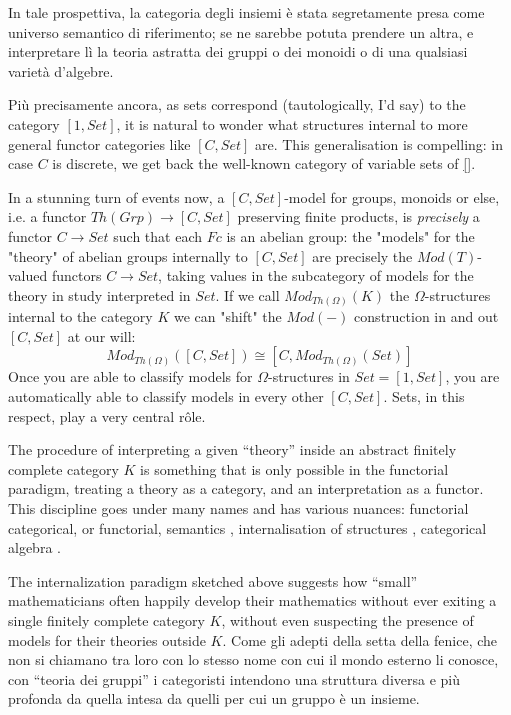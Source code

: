\documentclass[a4paper, 11pt]{article}
\begin{document}
In tale prospettiva, la categoria degli insiemi è stata segretamente presa come universo semantico di riferimento; se ne sarebbe potuta prendere un altra, e interpretare lì la teoria astratta dei gruppi o dei monoidi o di una qualsiasi varietà d'algebre.

Più precisamente ancora, as sets correspond (tautologically, I'd say) to the category $[1,Set]$, it is natural to wonder what structures internal to more general functor categories like $[C,Set]$ are. This generalisation is compelling: in case $C$ is discrete, we get back the well-known category of variable sets of \ref{}.

In a stunning turn of events now, a $[C,Set]$-model for groups, monoids or else, i.e. a functor $Th(Grp)\to [C,Set]$ preserving finite products, is \emph{precisely} a functor $C\to Set$ such that each $Fc$ is an abelian group: the "models" for the "theory" of abelian groups internally to $[C,Set]$ are precisely the $Mod(T)$-valued functors $C\to Set$, taking values in the subcategory of models for the theory in study interpreted in $Set$. If we call $Mod_{Th(\Omega)}( K)$ the $\Omega$-structures internal to the category $K$ we can "shift" the $Mod(-)$ construction in and out $[C,Set]$ at our will:
$$
Mod_{Th(\Omega)}([C,Set]) \cong [C, Mod_{Th(\Omega)}(Set)]
$$
Once you are able to classify models for $\Omega$-structures in $Set =[1,Set]$, you are automatically able to classify models in every other $[C,Set]$. Sets, in this respect, play a very central rôle.

The procedure of interpreting a given ``theory'' inside an abstract finitely complete category $K$ is something that is only possible in the functorial paradigm, treating a theory as a category, and an interpretation as a functor. This discipline goes under many names and has various nuances: functorial categorical, or functorial, semantics \cite{}, internalisation of structures \cite{}, categorical algebra \cite{}.

The internalization paradigm sketched above suggests how ``small'' mathematicians often happily develop their mathematics without ever exiting a single finitely complete category $K$, without even suspecting the presence of models for their theories outside $K$. Come gli adepti della setta della fenice, che non si chiamano tra loro con lo stesso nome con cui il mondo esterno li conosce, con ``teoria dei gruppi'' i categoristi intendono una struttura diversa e più profonda da quella intesa da quelli per cui un gruppo è un insieme.
\end{document}
